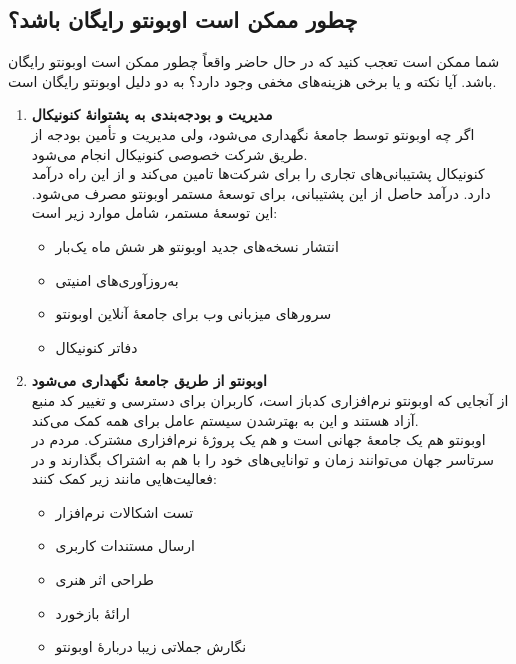 \subsection{چطور ممکن است اوبونتو رایگان باشد؟}
شما ممکن است تعجب کنید که در حال حاضر واقعاً چطور ممکن است اوبونتو رایگان باشد. آیا نکته و یا برخی هزینه‌های مخفی وجود دارد؟ به دو دلیل اوبونتو رایگان است.\\
\begin{enumerate}
\item \textbf{مدیریت و بودجه‌بندی به پشتوانهٔ کنونیکال}\\
اگر چه  اوبونتو توسط جامعهٔ  نگهداری می‌شود، ولی مدیریت و تأمین بودجه از طریق شرکت خصوصی کنونیکال انجام می‌شود.\\
کنونیکال پشتیبانی‌های تجاری را برای شرکت‌ها تامین می‌کند و از این راه درآمد دارد. درآمد حاصل از این پشتیبانی، برای توسعهٔ مستمر اوبونتو مصرف می‌شود. این توسعهٔ مستمر، شامل موارد زیر است:
\begin{itemize}
\item انتشار نسخه‌های جدید اوبونتو هر شش ماه یک‌بار
\item به‌روزآوری‌های امنیتی
\item سرورهای میزبانی وب برای جامعهٔ آنلاین اوبونتو 
\item دفاتر کنونیکال
\end{itemize}
\item \textbf{اوبونتو از طریق جامعهٔ  نگهداری می‌شود}\\
از آنجایی که اوبونتو نرم‌افزاری کدباز است، کاربران برای دسترسی و تغییر کد منبع آزاد هستند و این به بهترشدن سیستم عامل برای همه کمک می‌کند.\\
اوبونتو هم یک جامعهٔ جهانی است و هم یک پروژهٔ نرم‌افزاری مشترک. مردم در سرتاسر جهان می‌توانند زمان و توانایی‌های خود را با هم به اشتراک بگذارند و در فعالیت‌هایی مانند زیر کمک کنند:
\begin{itemize}
\item تست اشکالات نرم‌افزار
\item ارسال مستندات کاربری
\item طراحی اثر هنری
\item ارائهٔ بازخورد
\item نگارش جملاتی زیبا دربارهٔ اوبونتو
\end{itemize}
\end{enumerate}

